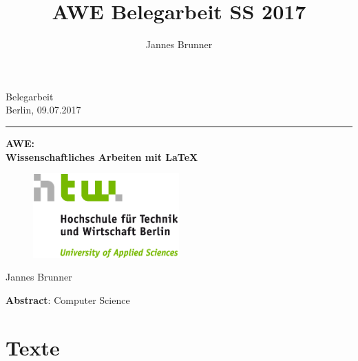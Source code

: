 \documentclass{scrreprt}
\begin{document}
\author{Jannes Brunner}
\title{AWE Belegarbeit SS 2017}

	\begin{titlepage}
		\begin{center}
			{\large Belegarbeit}\\
			{\large Berlin, 09.07.2017}
			\vspace{0.5cm} \hrule \vspace{0.6cm}
			{\huge \textbf{ AWE: \\ Wissenschaftliches Arbeiten mit LaTeX \\ }}
			\vspace{0.8cm}
			\begin{figure}[h!]
				\centering
				\includegraphics[width=0.5\textwidth]{images/HTW_Logo_rgb.png}
			\end{figure}
		
			\vspace{0.8cm}
			\large {Jannes Brunner}
		\end{center}
		\vspace{0.6cm}
		\textbf{Abstract}: Computer Science
	
		
	\end{titlepage}
	
	\tableofcontents
	
	\chapter{Texte}
\end{document}
